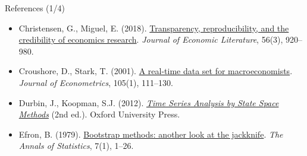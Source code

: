 \begin{frame}{References (1/4)}
\begin{itemize}
    \item Christensen, G., Miguel, E. (2018). \href{https://doi.org/10.1257/jel.20171350}{Transparency, reproducibility, and the credibility of economics research}. \emph{Journal of Economic Literature}, 56(3), 920--980.
    \item Croushore, D., Stark, T. (2001). \href{https://doi.org/10.1016/S0304-4076(01)00072-0}{A real-time data set for macroeconomists}. \emph{Journal of Econometrics}, 105(1), 111--130.
    \item Durbin, J., Koopman, S.J. (2012). \href{https://doi.org/10.1093/acprof:oso/9780199641178.001.0001}{\emph{Time Series Analysis by State Space Methods}} (2nd ed.). Oxford University Press.
    \item Efron, B. (1979). \href{https://doi.org/10.1214/aos/1176344552}{Bootstrap methods: another look at the jackknife}. \emph{The Annals of Statistics}, 7(1), 1--26.
\end{itemize}
\end{frame}

